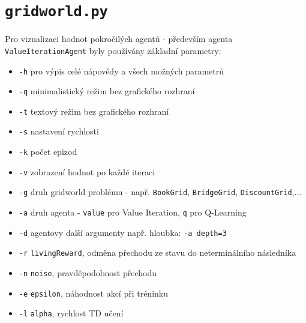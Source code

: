 \section{\texttt{gridworld.py}}
\label{priloha:manualg}
Pro vizualizaci hodnot pokročilých agentů - především agenta \texttt{ValueIterationAgent} byly používány základní parametry:
\begin{itemize}
\item \texttt{-h} pro výpis celé nápovědy a všech možných parametrů
\item \texttt{-q} minimalistický režim bez grafického rozhraní
\item \texttt{-t} textový režim bez grafického rozhraní
\item \texttt{-s} nastavení rychlosti
\item \texttt{-k} počet epizod
\item \texttt{-v} zobrazení hodnot po každé iteraci
\item \texttt{-g} druh gridworld problému - např. \texttt{BookGrid}, \texttt{BridgeGrid}, \texttt{DiscountGrid},...
\item \texttt{-a} druh agenta - \texttt{value} pro Value Iteration, \texttt{q} pro Q-Learning
\item \texttt{-d} agentovy další argumenty např. hloubka: \texttt{-a depth=3}
\item \texttt{-r} \texttt{livingReward}, odměna přechodu ze stavu do neterminálního následníka
\item \texttt{-n} \texttt{noise}, pravděpodobnost přechodu 
\item \texttt{-e} \texttt{epsilon}, náhodnost akcí při tréninku
\item \texttt{-l} \texttt{alpha}, rychlost TD učení
\end{itemize}
